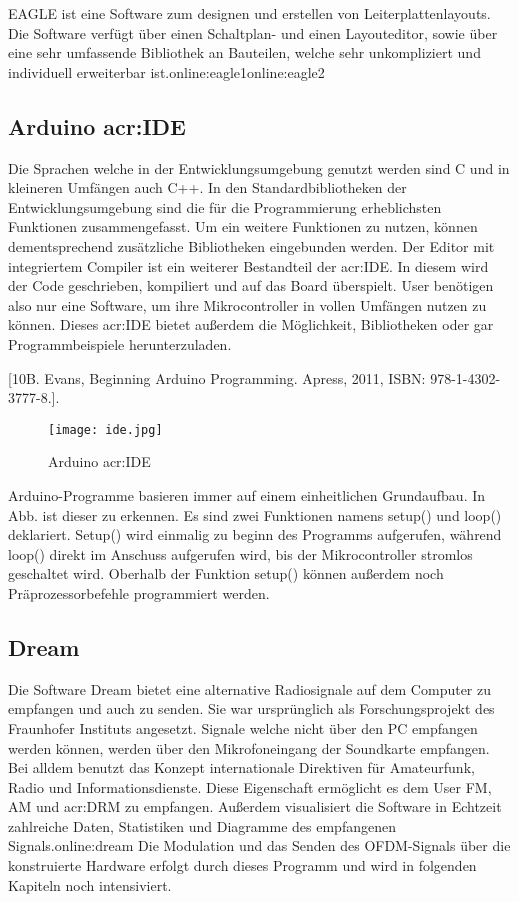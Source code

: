 EAGLE ist eine Software zum designen und erstellen von Leiterplattenlayouts. Die Software verfügt über einen Schaltplan- und einen Layouteditor, sowie über eine sehr umfassende Bibliothek an Bauteilen, welche sehr unkompliziert und individuell erweiterbar ist.\gls{online:eagle1}\gls{online:eagle2}

\subsection{Arduino \gls{acr:IDE}}
\label{subsec:Unterabschnitt12}

Die Sprachen welche in der Entwicklungsumgebung genutzt werden sind C und in kleineren Umfängen auch C++. In den Standardbibliotheken der Entwicklungsumgebung sind die für die Programmierung erheblichsten Funktionen zusammengefasst. Um ein weitere Funktionen zu nutzen, können dementsprechend zusätzliche Bibliotheken eingebunden werden. 
Der Editor mit integriertem Compiler ist ein weiterer Bestandteil der \gls{acr:IDE}. In diesem wird der Code geschrieben, kompiliert und auf das Board überspielt. User benötigen also nur eine Software, um ihre Mikrocontroller in vollen Umfängen nutzen zu können. Dieses \gls{acr:IDE} bietet außerdem die Möglichkeit, Bibliotheken oder gar Programmbeispiele herunterzuladen. 

[10B. Evans, Beginning Arduino Programming. Apress, 2011, ISBN: 978-1-4302-
3777-8.].

\begin{figure}[H]
	\centering
	\texttt{[image: ide.jpg]}
	\caption[Arduino \gls{acr:IDE}]{Arduino \gls{acr:IDE}}
	\cite{Eigen}
	\label{fig:ide}
\end{figure}


Arduino-Programme basieren immer auf einem einheitlichen Grundaufbau. In Abb. ist
dieser zu erkennen. Es sind zwei Funktionen namens setup() und loop() deklariert.
Setup() wird einmalig zu beginn des Programms aufgerufen, während loop() direkt im Anschuss aufgerufen wird, bis der Mikrocontroller stromlos geschaltet wird. Oberhalb der Funktion setup() können außerdem noch Präprozessorbefehle programmiert werden.

\subsection{Dream}
\label{subsec:Unterabschnitt12}
Die Software Dream bietet eine alternative Radiosignale auf dem Computer zu empfangen und auch zu senden. Sie war ursprünglich als Forschungsprojekt des Fraunhofer Instituts angesetzt. Signale welche nicht über den PC empfangen werden können, werden über den Mikrofoneingang der Soundkarte empfangen.
Bei alldem benutzt das Konzept internationale Direktiven für Amateurfunk, Radio und Informationsdienste.
Diese Eigenschaft ermöglicht es dem User FM, AM und \gls{acr:DRM} zu empfangen. Außerdem visualisiert die Software in Echtzeit zahlreiche Daten, Statistiken und Diagramme des empfangenen Signals.\gls{online:dream}
Die Modulation und das Senden des OFDM-Signals über die konstruierte Hardware erfolgt durch dieses Programm und wird in folgenden Kapiteln noch intensiviert.
